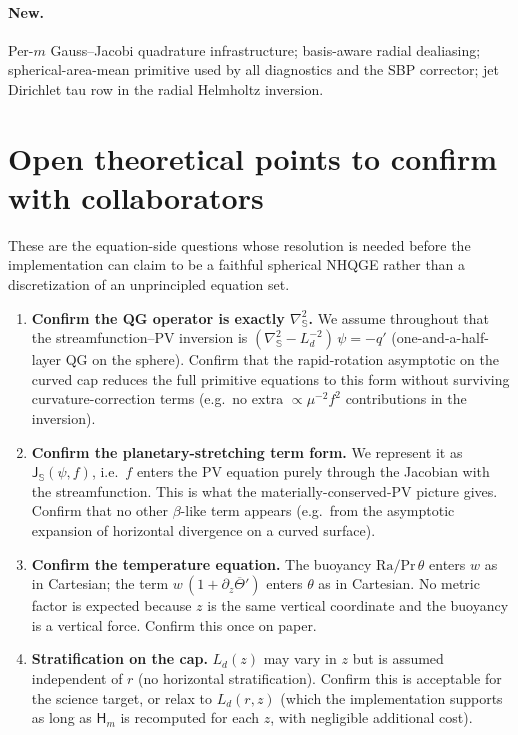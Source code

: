 \documentclass[11pt]{article}
\newcommand{\Lapsphere}{\nabla^2_{\!\mathbb{S}}}
\newcommand{\Jsphere}{\mathsf{J}_{\mathbb{S}}}
\newcommand{\Ld}{L_d}
\newcommand{\Ra}{\mathrm{Ra}}
\newcommand{\Pr}{\mathrm{Pr}}
\begin{document}
\paragraph{New.}  Per-$m$ Gauss--Jacobi quadrature infrastructure;
basis-aware radial dealiasing; spherical-area-mean primitive used by
all diagnostics and the SBP corrector; jet Dirichlet tau row in the
radial Helmholtz inversion.

\section{Open theoretical points to confirm with collaborators}

These are the equation-side questions whose resolution is needed
before the implementation can claim to be a faithful spherical
NHQGE rather than a discretization of an unprincipled equation set.

\begin{enumerate}[leftmargin=2em,itemsep=3pt]
  \item \textbf{Confirm the QG operator is exactly $\Lapsphere$.}
  We assume throughout that the streamfunction--PV inversion is
  $(\Lapsphere - \Ld^{-2})\,\psi = -q'$ (one-and-a-half-layer QG on
  the sphere).  Confirm that the rapid-rotation asymptotic on the
  curved cap reduces the full primitive equations to this form
  without surviving curvature-correction terms (e.g.\ no extra
  $\propto \mu^{-2} f^{2}$ contributions in the inversion).
  \item \textbf{Confirm the planetary-stretching term form.}  We
  represent it as $\Jsphere(\psi, f)$, i.e.\ $f$ enters the PV
  equation purely through the Jacobian with the streamfunction.  This
  is what the materially-conserved-PV picture gives.  Confirm that
  no other $\beta$-like term appears (e.g.\ from the asymptotic
  expansion of horizontal divergence on a curved surface).
  \item \textbf{Confirm the temperature equation.}  The buoyancy
  $\Ra/\Pr\,\theta$ enters $w$ as in Cartesian; the term
  $w\,(1+\partial_{z}\overline{\Theta}')$ enters $\theta$ as in
  Cartesian.  No metric factor is expected because $z$ is the same
  vertical coordinate and the buoyancy is a vertical force.  Confirm
  this once on paper.
  \item \textbf{Stratification on the cap.}  $\Ld(z)$ may vary in $z$
  but is assumed independent of $r$ (no horizontal stratification).
  Confirm this is acceptable for the science target, or relax to
  $\Ld(r, z)$ (which the implementation supports as long as $\mathsf{H}_{m}$
  is recomputed for each $z$, with negligible additional cost).
\end{enumerate}
\end{document}
